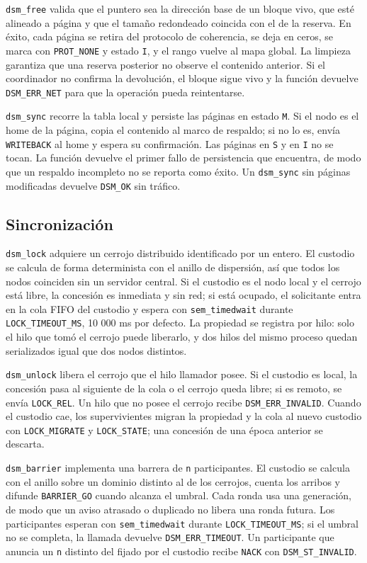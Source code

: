 \texttt{dsm\_free} valida que el puntero sea la dirección base de un bloque vivo, que esté alineado a página y que el tamaño redondeado coincida con el de la reserva. En éxito, cada página se retira del protocolo de coherencia, se deja en ceros, se marca con \texttt{PROT\_NONE} y estado \texttt{I}, y el rango vuelve al mapa global. La limpieza garantiza que una reserva posterior no observe el contenido anterior. Si el coordinador no confirma la devolución, el bloque sigue vivo y la función devuelve \texttt{DSM\_ERR\_NET} para que la operación pueda reintentarse.

\texttt{dsm\_sync} recorre la tabla local y persiste las páginas en estado \texttt{M}. Si el nodo es el home de la página, copia el contenido al marco de respaldo; si no lo es, envía \texttt{WRITEBACK} al home y espera su confirmación. Las páginas en \texttt{S} y en \texttt{I} no se tocan. La función devuelve el primer fallo de persistencia que encuentra, de modo que un respaldo incompleto no se reporta como éxito. Un \texttt{dsm\_sync} sin páginas modificadas devuelve \texttt{DSM\_OK} sin tráfico.

\subsection{Sincronización}

\texttt{dsm\_lock} adquiere un cerrojo distribuido identificado por un entero. El custodio se calcula de forma determinista con el anillo de dispersión, así que todos los nodos coinciden sin un servidor central. Si el custodio es el nodo local y el cerrojo está libre, la concesión es inmediata y sin red; si está ocupado, el solicitante entra en la cola FIFO del custodio y espera con \texttt{sem\_timedwait} durante \texttt{LOCK\_TIMEOUT\_MS}, 10 000 ms por defecto. La propiedad se registra por hilo: solo el hilo que tomó el cerrojo puede liberarlo, y dos hilos del mismo proceso quedan serializados igual que dos nodos distintos.

\texttt{dsm\_unlock} libera el cerrojo que el hilo llamador posee. Si el custodio es local, la concesión pasa al siguiente de la cola o el cerrojo queda libre; si es remoto, se envía \texttt{LOCK\_REL}. Un hilo que no posee el cerrojo recibe \texttt{DSM\_ERR\_INVALID}. Cuando el custodio cae, los supervivientes migran la propiedad y la cola al nuevo custodio con \texttt{LOCK\_MIGRATE} y \texttt{LOCK\_STATE}; una concesión de una época anterior se descarta.

\texttt{dsm\_barrier} implementa una barrera de \texttt{n} participantes. El custodio se calcula con el anillo sobre un dominio distinto al de los cerrojos, cuenta los arribos y difunde \texttt{BARRIER\_GO} cuando alcanza el umbral. Cada ronda usa una generación, de modo que un aviso atrasado o duplicado no libera una ronda futura. Los participantes esperan con \texttt{sem\_timedwait} durante \texttt{LOCK\_TIMEOUT\_MS}; si el umbral no se completa, la llamada devuelve \texttt{DSM\_ERR\_TIMEOUT}. Un participante que anuncia un \texttt{n} distinto del fijado por el custodio recibe \texttt{NACK} con \texttt{DSM\_ST\_INVALID}.

